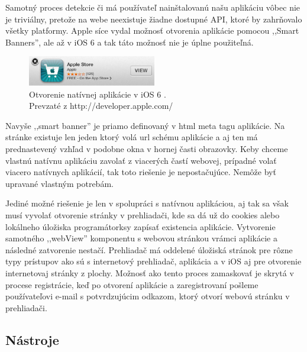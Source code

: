 Samotný proces detekcie či má používateľ nainštalovanú našu aplikáciu vôbec nie je triviálny, pretože na webe neexistuje žiadne dostupné API, ktoré by zahrňovalo všetky platformy. Apple síce vydal možnosť otvorenia aplikácie pomocou ,,Smart Banners'', ale až v iOS 6 a tak táto možnosť nie je úplne použiteľná.

\begin{figure}[H]
	\centering
	\includegraphics[width=0.5\textwidth]{img/smartappbanner.png}
	\caption[Otvorenie natívnej aplikácie v iOS 6]{
		Otvorenie natívnej aplikácie v iOS 6 \cite{smartappbanner}.\\
		Prevzaté z http://developer.apple.com/}
	\label{fig: smartappbanner}
\end{figure}

Navyše ,,smart banner'' je priamo definovaný v html meta tagu aplikácie. Na stránke existuje len jeden ktorý volá url schému aplikácie a aj ten má prednastevený vzhľad v podobne okna v hornej časti obrazovky. Keby chceme vlastnú natívnu aplikáciu zavolať z viacerých častí webovej, prípadné volať viacero natívnych aplikácií, tak toto riešenie je nepostačujúce. Nemôže byť upravané vlastným potrebám.

Jediné možné riešenie je len v spolupráci s natívnou aplikáciou, aj tak sa však musí vyvolať otvorenie stránky v prehliadači, kde sa dá už do cookies alebo lokálneho úložiska programátorksy zapísať existencia aplikácie. Vytvorenie samotného ,,webView'' komponentu s webovou stránkou vrámci aplikácie a následné zatvorenie nestačí. Prehliadač má oddelené úložiská stránok pre rôzne typy prístupov ako sú s internetový prehliadač, aplikácia a v iOS aj pre otvorenie internetovaj stránky z plochy. Možnosť ako tento proces zamaskovať je skrytá v procese registrácie, keď po otvorení aplikácie a zaregistrovaní pošleme používateľovi e-mail s potvrdzujúcim odkazom, ktorý otvorí webovú stránku v prehliadači.




\subsection{Nástroje} %
\label{sub:n_stroje}

